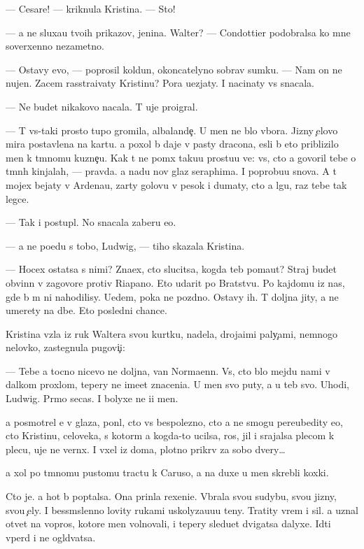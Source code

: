 \documentclass[10pt]{book}
\begin{document}
— Cesare! — kriknula Kristina. — Sto{\y}!

— {\Y}a ne sluxa{\y}u tvo{\y}ih prikazov, jen{\x}ina. Walter? — Condottier podobralsa ko mne soverxenno nezametno.

— Ostavy {\y}evo, — poprosil koldun, okoncatelyno sobrav sumku. — Nam on ne nujen. Zacem rasstra{\y}ivaty Kristinu? Pora u{\y}ezjaty. I nacinaty vs{\e} snacala.

— Ne budet nikakovo nacala. T{\yi} uje proigral.

— T{\yi} vs{\e}-taki prosto tupo{\y} gromila, albalande{\c}. U men{\ia} ne b{\yi}lo v{\yi}bora. Jizny {\c}elovo mira postavlena na kartu. {\Y}a poxol b{\yi} daje v pasty dracona, {\y}esli b{\yi} eto priblizilo men{\ia} k t{\e}mnomu kuzne{\c}u. Kak t{\yi} ne po{\y}m{\e}x taku{\y}u prostu{\y}u ve{\x}: vs{\e}, cto {\y}a govoril tebe o t{\e}mn{\yi}h kinjalah, — pravda. {\Y}a na{\y}du nov{\yi}{\y} glaz seraphima. I poprobu{\y}u snova. A t{\yi} mojex bejaty v Ardenau, zar{\yi}ty golovu v pesok i dumaty, cto {\y}a lgu, raz tebe tak legce.

— Tak i postupl{\io}. No snacala zaberu {\y}e{\y}o.

— {\Y}a ne po{\y}edu s tobo{\y}, Ludwig, — tiho skazala Kristina.

— Hocex ostatsa s nimi? Zna{\y}ex, cto slucitsa, kogda teb{\ia} po{\y}ma{\y}ut? Straj budet obvin{\e}n v zagovore protiv Riapano. Eto udarit po Bratstvu. Po kajdomu iz nas, gde b{\yi} m{\yi} ni nahodilisy. U{\y}edem, poka ne pozdno. Ostavy ih. T{\yi} doljna jity, a ne umerety na d{\yi}be. Eto posledni{\y} chance.

Kristina vz{\ia}la iz ruk Waltera svo{\y}u kurtku, nadela, droja{\x}imi paly{\c}ami, nemnogo nelovko, zastegnula pugovi{\c}i:

— Tebe {\y}a tocno nicevo ne doljna, van Normaenn. Vs{\e}, cto b{\yi}lo mejdu nami v dal{\e}kom proxlom, tepery ne ime{\y}et znaceni{\y}a. U men{\ia} svo{\y} puty, a u teb{\ia} svo{\y}. Uhodi, Ludwig. Pr{\ia}mo se{\y}cas. I bolyxe ne i{\x}i men{\ia}.

{\Y}a posmotrel {\y}e{\y} v glaza, pon{\ia}l, cto vs{\e} bespolezno, cto {\y}a ne smogu pereubedity {\y}e{\y}o, cto Kristinu, celoveka, s kotor{\yi}m {\y}a kogda-to ucilsa, ros, jil i srajalsa plecom k plecu, uje ne vern{\e}x. I v{\yi}xel iz doma, plotno prikr{\yi}v za sobo{\y} dvery…

{\Y}a xol po t{\e}mnomu pustomu tractu k Caruso, a na duxe u men{\ia} skrebli koxki.

Cto je. {\Y}a hot{\ia} b{\yi} pop{\yi}talsa. Ona prin{\ia}la rexeni{\y}e. V{\yi}brala svo{\y}u sudybu, svo{\y}u jizny, svo{\y}u {\c}ely. I bessm{\yi}slenno lovity rukami uskolyza{\y}u{\x}u{\y}u teny. Tratity vrem{\ia} i sil{\yi}. {\Y}a uznal otvet{\yi} na vopros{\yi}, kotor{\yi}{\y}e men{\ia} volnovali, i tepery sledu{\y}et dvigatsa dalyxe. Idti vper{\e}d i ne ogl{\ia}d{\yi}vatsa.
\end{document}
